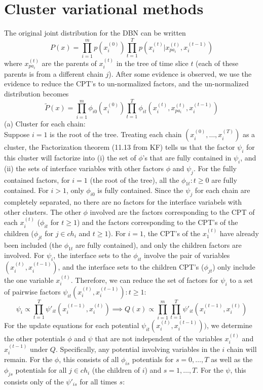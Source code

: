 \documentclass[11pt]{article}
\begin{document}
\section{Cluster variational methods}
The original joint distribution for the DBN can be written
\[ P(x) = \prod_{i=1}^m p(x_i^{(0)}) \prod_{t=1}^T p(x_i^{(t)} | x_{pa_i}^{(t)}, x_i^{(t-1)})\]
where $x_{pa_i}^{(t)}$ are the parents of $x_i^{(t)}$ in the tree of time slice $t$ (each of these parents is from a different chain $j$). After some evidence is observed, we use the evidence to reduce the CPT's to un-normalized factors, and the un-normalized distribution becomes
\[ \tilde{P}(x) = \prod_{i=1}^m \phi_{i0}(x_i^{(0)}) \prod_{t=1}^T \phi_{it}(x_i^{(t)}, x_{pa_i}^{(t)}, x_i^{(t-1)})  \]
(a) Cluster for each chain:\\
Suppose $i = 1$ is the root of the tree. Treating each chain $(x_i^{(0)},\ldots,x_i^{(T)})$ as a cluster, the Factorization theorem (11.13 from KF) tells us that the factor $\psi_i$ for this cluster will factorize into (i) the set of $\phi$'s that are fully contained in $\psi_i$, and (ii) the sets of interface variables with other factors $\phi$ and $\psi_j$. For the fully contained factors, for $i = 1$ (the root of the tree), all the $\phi_{1t} : t \ge 0$ are fully contained. For $i > 1$, only $\phi_{i0}$ is fully contained. Since the $\psi_j$ for each chain are completely separated, no there are no factors for the interface variabels with other clusters. The other $\phi$ involved are the factors corresponding to the CPT of each $x_i^{(t)}$ ($\phi_{it}$ for $t \ge 1$) and the factors corresponding to the CPT's of the children ($\phi_{jt}$ for $j \in ch_i$ and $t \ge 1$). For $i = 1$, the CPT's of the $x_1^{(t)}$ have already been included (the $\phi_{1t}$ are fully contained), and only the children factors are involved. For $\psi_i$, the interface sets to the $\phi_{it}$ involve the pair of variables $(x_i^{(t)},x_i^{(t-1)})$, and the interface sets to the children CPT's ($\phi_{jt}$) only include the one variable $x_i^{(t)}$. Therefore, we can reduce the set of factors for $\psi_i$ to a set of pairwise factors $\psi_{it}(x_i^{(t)}, x_i^{(t-1)}) : t \ge 1$:
\[ \psi_i \propto \prod_{t=1}^T \psi'_{it}(x_i^{(t-1)},x_i^{(t)}) \implies Q(x) \propto \prod_{i=1}^m \prod_{t=1}^T  \psi'_{it}(x_i^{(t-1)},x_i^{(t)}) \]
For the update equations for each potential $\psi_{it}(x_i^{(t)}, x_i^{(t-1)}))$, we determine the other potentials $\phi$ and $\psi$ that are not independent of the variables $x_i^{(t)}$ and $x_i^{(t-1)}$ under $Q$. Specifically, any potential involving variables in the $i$ chain will remain. For the $\phi$, this consists of all $\phi_{is}$ potentials for $s = 0,\ldots,T$ as well as the $\phi_{js}$ potentials for all $j \in ch_i$ (the children of $i$) and $s = 1,\ldots,T$. For the $\psi$, this consists only of the $\psi'_{is}$ for all times $s$:
\end{document}
